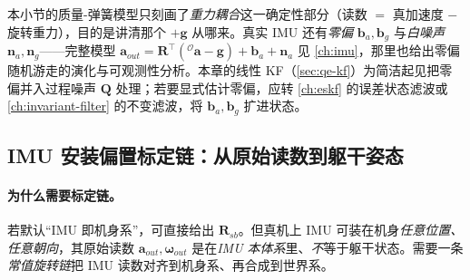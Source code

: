 \begin{note}\label{note:qe-imu-bridge}
本小节的质量-弹簧模型只刻画了\emph{重力耦合}这一确定性部分（读数 $=$ 真加速度 $-$ 旋转重力），目的是讲清那个 $+\boldsymbol{g}$ 从哪来。真实 IMU 还有\emph{零偏} $\boldsymbol{b}_a,\boldsymbol{b}_g$ 与\emph{白噪声} $\boldsymbol{n}_a,\boldsymbol{n}_g$——完整模型 $\boldsymbol{a}_{out}=\mathbf{R}^\top({}^{\mathcal{O}}\boldsymbol{a}-\boldsymbol{g})+\boldsymbol{b}_a+\boldsymbol{n}_a$ 见 \cref{ch:imu}，那里也给出零偏随机游走的演化与可观测性分析。本章的线性 KF（\cref{sec:qe-kf}）为简洁起见把零偏并入过程噪声 $\mathbf{Q}$ 处理；若要显式估计零偏，应转 \cref{ch:eskf} 的误差状态滤波或 \cref{ch:invariant-filter} 的不变滤波，将 $\boldsymbol{b}_a,\boldsymbol{b}_g$ 扩进状态。
\end{note}

\subsection{IMU 安装偏置标定链：从原始读数到躯干姿态}
\label{subsec:qe-imu-calib}

\paragraph{为什么需要标定链。}
若默认“IMU 即机身系”，可直接给出 $\mathbf{R}_{sb}$。但真机上 IMU 可装在机身\emph{任意位置、任意朝向}，其原始读数 $\boldsymbol{a}_{out},\boldsymbol{\omega}_{out}$ 是在\emph{IMU 本体系}里、\emph{不}等于躯干状态\cite{yu2021quadruped}。需要一条\emph{常值旋转链}把 IMU 读数对齐到机身系、再合成到世界系。

